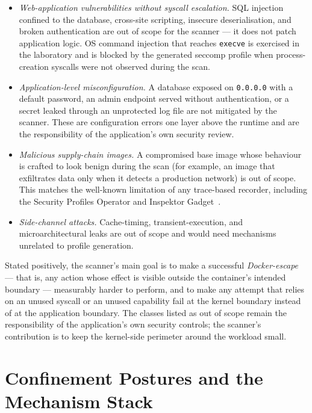 \begin{itemize}
    \item \emph{Web-application vulnerabilities without syscall escalation.} SQL injection confined to the database, cross-site scripting, insecure deserialisation, and broken authentication are out of scope for the scanner --- it does not patch application logic. OS command injection that reaches \texttt{execve} is exercised in the laboratory and is blocked by the generated seccomp profile when process-creation syscalls were not observed during the scan.
    \item \emph{Application-level misconfiguration.} A database exposed on \texttt{0.0.0.0} with a default password, an admin endpoint served without authentication, or a secret leaked through an unprotected log file are not mitigated by the scanner. These are configuration errors one layer above the runtime and are the responsibility of the application's own security review.
    \item \emph{Malicious supply-chain images.} A compromised base image whose behaviour is crafted to look benign during the scan (for example, an image that exfiltrates data only when it detects a production network) is out of scope. This matches the well-known limitation of any trace-based recorder, including the Security Profiles Operator and Inspektor Gadget~\cite{spo2025,inspektorgadget2025}.
    \item \emph{Side-channel attacks.} Cache-timing, transient-execution, and microarchitectural leaks are out of scope and would need mechanisms unrelated to profile generation.
\end{itemize}

Stated positively, the scanner's main goal is to make a successful \emph{Docker-escape} --- that is, any action whose effect is visible outside the container's intended boundary --- measurably harder to perform, and to make any attempt that relies on an unused syscall or an unused capability fail at the kernel boundary instead of at the application boundary. The classes listed as out of scope remain the responsibility of the application's own security controls; the scanner's contribution is to keep the kernel-side perimeter around the workload small.

\section{Confinement Postures and the Mechanism Stack}\label{sec:design-security-levels}

